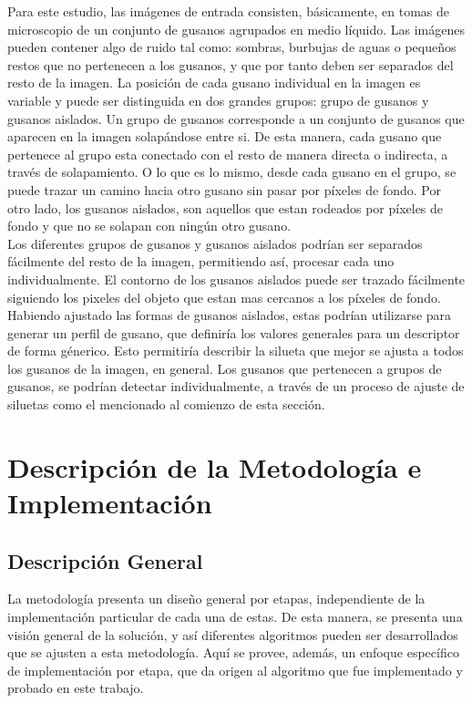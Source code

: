 Para este estudio, las im\'agenes de entrada consisten, b\'asicamente, en
tomas de microscopio de un conjunto de gusanos agrupados en medio 
l\'iquido. Las im\'agenes pueden contener algo de ruido tal como: 
sombras, burbujas de aguas o peque\~nos restos que no pertenecen a
los gusanos, y que por tanto deben ser separados del resto de la imagen. La
posici\'on de cada gusano individual en la imagen es variable y puede
ser distinguida en dos grandes grupos: grupo de gusanos y gusanos aislados.
Un grupo de gusanos corresponde a un conjunto de gusanos que aparecen en la
imagen solap\'andose entre si. De esta manera, cada gusano que pertenece
al grupo esta conectado con el resto de manera directa o indirecta,
 a trav\'es de solapamiento. O lo que es lo mismo, desde cada gusano en el grupo,
se puede trazar un camino hacia otro gusano sin pasar por p\'ixeles de fondo.  
Por otro lado, los gusanos aislados, son aquellos que estan rodeados por
p\'ixeles de fondo y que no se solapan con ning\'un otro gusano.\\

Los diferentes grupos de gusanos y gusanos aislados podr\'ian ser
separados f\'acilmente del resto de la imagen, permitiendo as\'i, 
procesar cada uno individualmente. El contorno de los gusanos aislados
puede ser trazado f\'acilmente siguiendo los pixeles del objeto que
estan mas cercanos a los p\'ixeles de fondo. Habiendo ajustado las formas
de gusanos aislados, estas podr\'ian utilizarse para generar un perfil
de gusano, que definir\'ia los valores generales para un descriptor de forma
g\'enerico. Esto permitir\'ia describir la silueta que mejor se ajusta a todos
los gusanos de la imagen, en general.
Los gusanos que pertenecen a grupos de gusanos, se podr\'ian detectar
individualmente, a trav\'es de un proceso de ajuste de siluetas como
el mencionado al comienzo de esta secci\'on.

\section{Descripci\'on de la Metodolog\'ia e Implementaci\'on}
\label{met:description}

\subsection{Descripci\'on General}

La metodolog\'ia presenta un dise\~no general por etapas, 
independiente de la implementaci\'on particular de cada una de estas. De esta
manera, se presenta una visi\'on general de la soluci\'on, y as\'i diferentes
algoritmos pueden ser desarrollados que se ajusten a esta metodolog\'ia.
Aqu\'i se provee, adem\'as, un enfoque espec\'ifico de implementaci\'on por etapa, que da
origen al algoritmo que fue implementado y probado en este trabajo.\\

